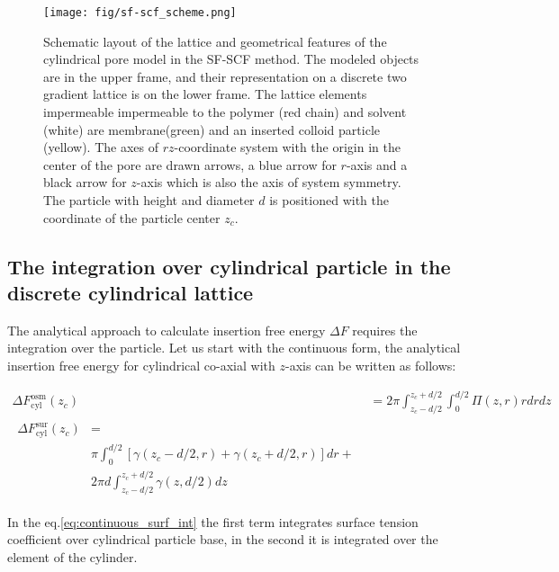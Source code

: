 \documentclass[12pt, a4paper]{article}
\begin{document}
\begin{figure}
        \centering
        \texttt{[image: fig/sf-scf\_scheme.png]}
        \caption{
        Schematic layout of the lattice and geometrical features of the cylindrical pore model in the SF-SCF method.
        The modeled objects are in the upper frame, and their representation on a discrete two gradient lattice is on the lower frame.
        The lattice elements impermeable impermeable to the polymer (red chain) and solvent (white) are membrane(green) and an inserted colloid particle (yellow). 
        The axes of $rz$-coordinate system with the origin in the center of the pore are drawn arrows, a blue arrow for $r$-axis and a black arrow for $z$-axis which is also the axis of system symmetry.
        \\
        The particle with height and diameter $d$ is positioned with the coordinate of the particle center $z_c$. 
        }
    \label{fig:sf-scf_scheme}
\end{figure}

\subsection*{The integration over cylindrical particle in the discrete cylindrical lattice}
The analytical approach to calculate insertion free energy $\Delta F$ requires the integration over the particle.
Let us start with the continuous form, the analytical insertion free energy for cylindrical co-axial with $z$-axis can be written as follows:

\begin{align}
    \Delta F_{\textrm{cyl}}^{\textrm{osm}}(z_c) &= 2 \pi \int_{z_c-d/2}^{z_c+d/2} \int_{0}^{d/2} \Pi(z, r) r dr dz
    \\
    \begin{split}\label{eq:continuous_surf_int}
        \Delta F_{\textrm{cyl}}^{\textrm{sur}}(z_c) &= 
        \\
        &\pi \int_{0}^{d/2} \left[\gamma(z_c-d/2, r) + \gamma(z_c+d/2,r)\right] dr +
        \\
        &2 \pi d \int_{z_c-d/2}^{z_c+d/2} \gamma(z,d/2) dz 
    \end{split}
\end{align}

In the eq.\ref{eq:continuous_surf_int} the first term integrates surface tension coefficient over cylindrical particle base, in the second it is integrated over the element of the cylinder.
\end{document}
